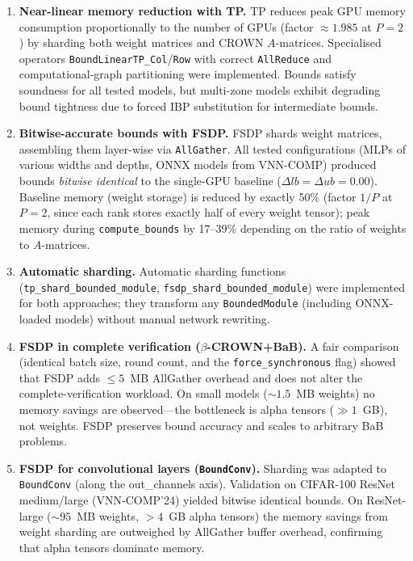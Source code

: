 \begin{enumerate}
    \item \textbf{Near-linear memory reduction with TP.}
    TP reduces peak GPU memory consumption proportionally to the number of GPUs
    (factor $\approx\!1.985$ at $P = 2$) by sharding both weight matrices and
    CROWN $A$-matrices. Specialised operators
    \texttt{BoundLinearTP\_Col}/\texttt{Row} with correct \texttt{AllReduce}
    and computational-graph partitioning were implemented.
    Bounds satisfy soundness for all tested models, but multi-zone models
    exhibit degrading bound tightness due to forced IBP substitution for
    intermediate bounds.

    \item \textbf{Bitwise-accurate bounds with FSDP.}
    FSDP shards weight matrices, assembling them layer-wise via
    \texttt{AllGather}. All tested configurations (MLPs of various widths and
    depths, ONNX models from VNN-COMP) produced bounds \textit{bitwise identical}
    to the single-GPU baseline ($\Delta lb = \Delta ub = 0.00$). Baseline
    memory (weight storage) is reduced by exactly 50\% (factor $1/P$ at $P{=}2$,
    since each rank stores exactly half of every weight tensor); peak memory
    during \texttt{compute\_bounds} by 17--39\% depending on the ratio of
    weights to $A$-matrices.

    \item \textbf{Automatic sharding.}
    Automatic sharding functions (\texttt{tp\_shard\_bounded\_module},
    \texttt{fsdp\_shard\_bounded\_module}) were implemented for both approaches;
    they transform any \texttt{BoundedModule} (including ONNX-loaded models)
    without manual network rewriting.

    \item \textbf{FSDP in complete verification ($\beta$-CROWN+BaB).}
    A fair comparison (identical batch size, round count, and the
    \texttt{force\_synchronous} flag) showed that FSDP adds
    $\leq\!5$~MB AllGather overhead and does not alter the complete-verification
    workload. On small models (${\sim}1.5$~MB weights) no memory savings are
    observed---the bottleneck is alpha tensors ($\gg\!1$~GB), not weights.
    FSDP preserves bound accuracy and scales to arbitrary BaB problems.

    \item \textbf{FSDP for convolutional layers (\texttt{BoundConv}).}
    Sharding was adapted to \texttt{BoundConv} (along the out\_channels axis).
    Validation on CIFAR-100 ResNet medium/large (VNN-COMP'24) yielded bitwise
    identical bounds. On ResNet-large (${\sim}95$~MB weights, $>\!4$~GB
    alpha tensors) the memory savings from weight sharding are outweighed by
    AllGather buffer overhead, confirming that alpha tensors dominate memory.


\end{enumerate}
